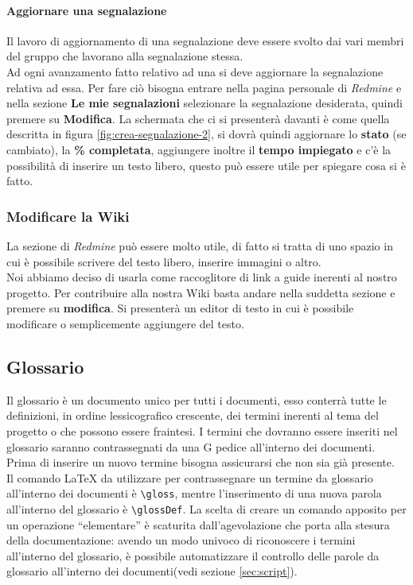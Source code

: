 \documentclass{scalatekids-article}
\begin{document}
\paragraph{Aggiornare una segnalazione}
Il lavoro di aggiornamento di una segnalazione deve essere svolto dai vari membri del gruppo che lavorano alla segnalazione stessa.\\
Ad ogni avanzamento fatto relativo ad una  si deve aggiornare la segnalazione relativa ad essa. Per fare ciò bisogna entrare nella pagina personale di \textit{Redmine} e nella sezione \textbf{Le mie segnalazioni} selezionare la segnalazione desiderata, quindi premere su \textbf{Modifica}.
La schermata che ci si presenterà davanti è come quella descritta in figura \ref{fig:crea-segnalazione-2}, si dovrà quindi aggiornare lo \textbf{stato} (se cambiato), la \textbf{\% completata}, aggiungere inoltre il \textbf{tempo impiegato} e c'è la possibilità di inserire un testo libero, questo può essere utile per spiegare cosa si è fatto.
\subsubsection{Modificare la Wiki}
La sezione  di \textit{Redmine} può essere molto utile, di fatto si tratta di uno spazio in cui è possibile scrivere del testo libero, inserire immagini o altro.\\
Noi abbiamo deciso di usarla come raccoglitore di link a guide inerenti al nostro progetto.
Per contribuire alla nostra Wiki basta andare nella suddetta sezione e premere su \textbf{modifica}. Si presenterà un editor di testo in cui è possibile modificare o semplicemente aggiungere del testo.

\subsection{Glossario}
Il glossario è un documento unico per tutti i documenti, esso conterrà tutte le
definizioni, in ordine lessicografico crescente, dei termini inerenti al tema
del progetto o che possono essere fraintesi. I termini che dovranno essere
inseriti nel glossario saranno contrassegnati da una G pedice all'interno dei
documenti. Prima di inserire un nuovo termine bisogna assicurarsi che non sia
già presente.\\ Il comando \LaTeX\xspace da utilizzare per contrassegnare un
termine da glossario all'interno dei documenti è \verb=\gloss=, mentre l'inserimento
di una nuova parola all'interno del glossario è \verb=\glossDef=. La scelta di creare
un comando apposito per un operazione ``elementare'' è scaturita
dall'agevolazione che porta alla stesura della documentazione: avendo un modo
univoco di riconoscere i termini all'interno del glossario, è possibile
automatizzare il controllo delle parole da glossario all'interno dei
documenti(vedi sezione \ref{sec:script}).
\end{document}

